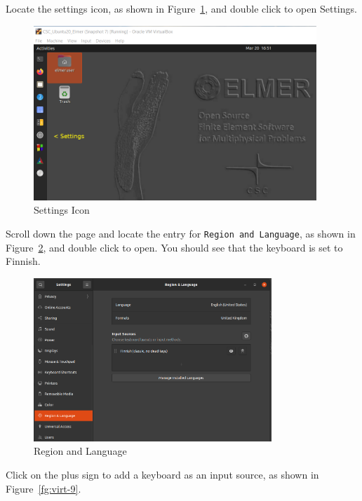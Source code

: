 Locate the settings icon, as shown in Figure~\ref{fg:virt-7}, and double click to open Settings.

\begin{figure}[H]
\begin{center}
\includegraphics[width=0.95\textwidth]{virt-7}
\caption{Settings Icon}\label{fg:virt-7}
\end{center}
\end{figure}

Scroll down the page and locate the entry for \texttt{Region and Language}, as shown in Figure~\ref{fg:virt-8}, and double click to open.  You should see that the keyboard is set to Finnish.

\begin{figure}[H]
\begin{center}
\includegraphics[width=0.8\textwidth]{virt-8}
\caption{Region and Language}\label{fg:virt-8}
\end{center}
\end{figure}

Click on the plus sign to add a keyboard as an input source, as shown in Figure~\ref{fg:virt-9}.

